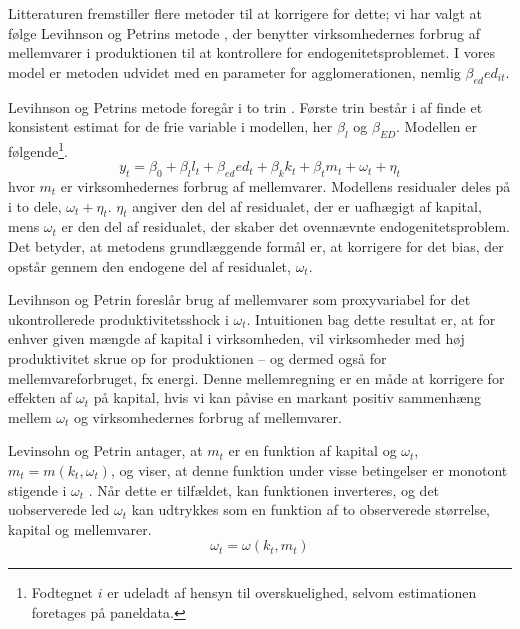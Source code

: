 Litteraturen fremstiller flere metoder til at korrigere for dette; vi har valgt at følge Levihnson og Petrins metode \cite{levinsohn2003estimating}, der benytter virksomhedernes forbrug af mellemvarer i produktionen til at kontrollere for endogenitetsproblemet. I vores model er metoden udvidet med en parameter for agglomerationen, nemlig $\beta_{ed} ed_{it}$.

Levihnson og Petrins metode foregår i to trin \cite[p. 115ff.]{petrin2004production}. Første trin består i af finde et konsistent estimat for de frie variable i modellen, her $\beta_l$ og $\beta_{ED}$. Modellen er følgende\footnote{Fodtegnet $i$ er udeladt af hensyn til overskuelighed, selvom estimationen foretages på paneldata.}.
\begin{equation}
	y_{t} = \beta_0 + \beta_l l_t+ \beta_{ed} ed_t +
	\beta_k k_t + \beta_t m_t + \omega_t + \eta_t
	\label{LP_01}
\end{equation}
hvor $m_t$ er virksomhedernes forbrug af mellemvarer. Modellens residualer deles på i to dele, $\omega_t + \eta_t$. $\eta_t$ angiver den del af residualet, der er uafhægigt af kapital, mens $\omega_t$ er den del af residualet, der skaber det ovennævnte endogenitetsproblem. Det betyder, at metodens grundlæggende formål er, at korrigere for det bias, der opstår gennem den endogene del af residualet, 
$\omega_t$.

Levihnson og Petrin foreslår brug af mellemvarer som proxyvariabel for det ukontrollerede produktivitetsshock i $\omega_t$. Intuitionen bag dette resultat er, at for enhver given mængde af kapital i virksomheden, vil virksomheder med høj produktivitet skrue op for produktionen -- og dermed også for mellemvareforbruget, fx energi. Denne mellemregning er en måde at korrigere for effekten af $\omega_t$ på kapital, hvis vi kan påvise en markant positiv sammenhæng mellem $\omega_t$ og virksomhedernes forbrug af mellemvarer.

Levinsohn og Petrin antager, at $m_t$ er en funktion af kapital og $\omega_t$, $m_t = m(k_t , \omega_t)$, og viser, at denne funktion under visse betingelser er monotont stigende i $\omega_t$ \cite[322-323]{levinsohn2003estimating}. Når dette er tilfældet, kan funktionen inverteres, og det uobserverede led $\omega_t$ kan udtrykkes som en funktion af to observerede størrelse, kapital og mellemvarer.
\begin{equation}
	\omega_t = \omega(k_t , m_t)
	\label{eq:InverseOmega}
\end{equation}

